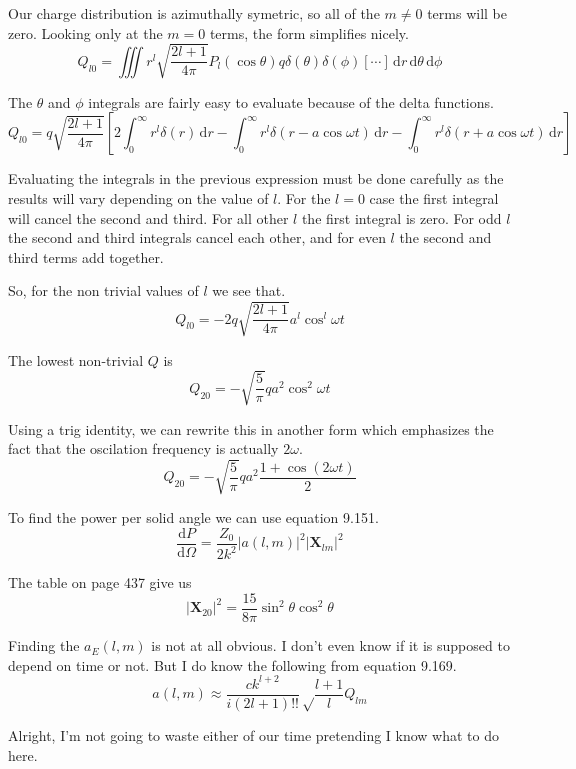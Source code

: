 \documentclass[10pt,a4paper]{article}
\begin{document}
Our charge distribution is azimuthally symetric, so all of the $m\neq0$ terms will be zero.  Looking only at the $m=0$ terms, the form simplifies nicely.
\begin{equation}
Q_{l0}=\iiint r^l\sqrt{\frac{2l+1}{4\pi}}P_l(\cos\theta)q\delta(\theta)\delta(\phi)[\cdots]\,\mathrm{d}r\,\mathrm{d}\theta\,\mathrm{d}\phi
\end{equation}

The $\theta$ and $\phi$ integrals are fairly easy to evaluate because of the delta functions.
\begin{equation}
Q_{l0}=q\sqrt{\frac{2l+1}{4\pi}}\left[
2\int_0^\infty r^l \delta(r) \,\mathrm{d}r
-\int_0^\infty r^l \delta(r-a\cos\omega t) \,\mathrm{d}r
-\int_0^\infty r^l \delta(r+a\cos\omega t) \,\mathrm{d}r
\right]
\end{equation}

Evaluating the integrals in the previous expression must be done carefully as the results will vary depending on the value of $l$.  For the $l=0$ case the first integral will cancel the second and third.  For all other $l$ the first integral is zero.  For odd $l$ the second and third integrals cancel each other, and for even $l$ the second and third terms add together.

So, for the non trivial values of $l$ we see that.
\begin{equation}
Q_{l0}=-2q\sqrt{\frac{2l+1}{4\pi}}a^l\cos^l \omega t
\end{equation}

The lowest non-trivial $Q$ is
\begin{equation}
Q_{20}=-\sqrt{\frac{5}{\pi}}qa^2\cos^2\omega t
\end{equation}

Using a trig identity, we can rewrite this in another form which emphasizes the fact that the oscilation frequency is actually $2\omega$.
\begin{equation}
Q_{20}=-\sqrt{\frac{5}{\pi}}qa^2\frac{1+\cos(2\omega t)}{2}
\end{equation}

To find the power per solid angle we can use equation 9.151.
\begin{equation}
\frac{\mathrm{d}P}{\mathrm{d}\Omega}=\frac{Z_0}{2k^2}\left|a(l,m)\right|^2\left|\mathbf{X}_{lm}\right|^2
\end{equation}

The table on page 437 give us
\begin{equation}
\left|\mathbf{X}_{20}\right|^2=\frac{15}{8\pi}\sin^2\theta\cos^2\theta
\end{equation}

Finding the $a_E(l,m)$ is not at all obvious.  I don't even know if it is supposed to depend on time or not.  But I do know the following from equation 9.169.
\begin{equation}
a(l,m)\approx \frac{ck^{l+2}}{i(2l+1)!!}\sqrt\frac{l+1}{l}Q_{lm}
\end{equation}

Alright, I'm not going to waste either of our time pretending I know what to do here.
\end{document}
